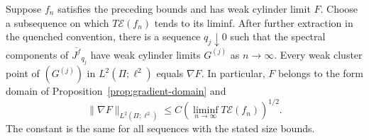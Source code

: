 \begin{proposition}
\label{prop:gradient-observation}
Suppose $f_n$ satisfies the preceding bounds and has weak cylinder
limit $F$. Choose a subsequence on which $T\mathcal E(f_n)$ tends to
its liminf. After further extraction in the quenched convention, there
is a sequence $q_j\downarrow0$ such that the spectral components of
$\overline{J^f}_{q_j}$ have weak cylinder limits $G^{(j)}$ as
$n\to\infty$. Every weak cluster point of $(G^{(j)})$ in
$L^2(\Pi;\ell^2)$ equals $\nabla F$. In particular,
$F$ belongs to the form domain of Proposition~\ref{prop:gradient-domain}
and
\begin{equation}
 \|\nabla F\|_{L^2(\Pi;\ell^2)}
 \le C\left(\liminf_{n\to\infty}T\mathcal E(f_n)\right)^{1/2}.
 \label{eq:source-28}
\end{equation}
The constant is the same for all sequences with the stated size bounds.
\end{proposition}

